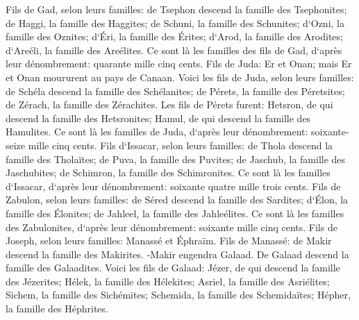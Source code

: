 \verse Fils de Gad, selon leurs familles: de Tsephon descend la famille des Tsephonites; de Haggi, la famille des Haggites; de Schuni, la famille des Schunites; 
\verse d`Ozni, la famille des Oznites; d`Éri, la famille des Érites; 
\verse d`Arod, la famille des Arodites; d`Areéli, la famille des Areélites. 
\verse Ce sont là les familles des fils de Gad, d`après leur dénombrement: quarante mille cinq cents. 
\verse Fils de Juda: Er et Onan; mais Er et Onan moururent au pays de Canaan. 
\verse Voici les fils de Juda, selon leurs familles: de Schéla descend la famille des Schélanites; de Pérets, la famille des Péretsites; de Zérach, la famille des Zérachites. 
\verse Les fils de Pérets furent: Hetsron, de qui descend la famille des Hetsronites; Hamul, de qui descend la famille des Hamulites. 
\verse Ce sont là les familles de Juda, d`après leur dénombrement: soixante-seize mille cinq cents. 
\verse Fils d`Issacar, selon leurs familles: de Thola descend la famille des Tholaïtes; de Puva, la famille des Puvites; 
\verse de Jaschub, la famille des Jaschubites; de Schimron, la famille des Schimronites. 
\verse Ce sont là les familles d`Issacar, d`après leur dénombrement: soixante quatre mille trois cents. 
\verse Fils de Zabulon, selon leurs familles: de Séred descend la famille des Sardites; d`Élon, la famille des Élonites; de Jahleel, la famille des Jahleélites. 
\verse Ce sont là les familles des Zabulonites, d`après leur dénombrement: soixante mille cinq cents. 
\verse Fils de Joseph, selon leurs familles: Manassé et Éphraïm. 
\verse Fils de Manassé: de Makir descend la famille des Makirites. -Makir engendra Galaad. De Galaad descend la famille des Galaadites. 
\verse Voici les fils de Galaad: Jézer, de qui descend la famille des Jézerites; Hélek, la famille des Hélekites; 
\verse Asriel, la famille des Asriélites; Sichem, la famille des Sichémites; 
\verse Schemida, la famille des Schemidaïtes; Hépher, la famille des Héphrites. 
